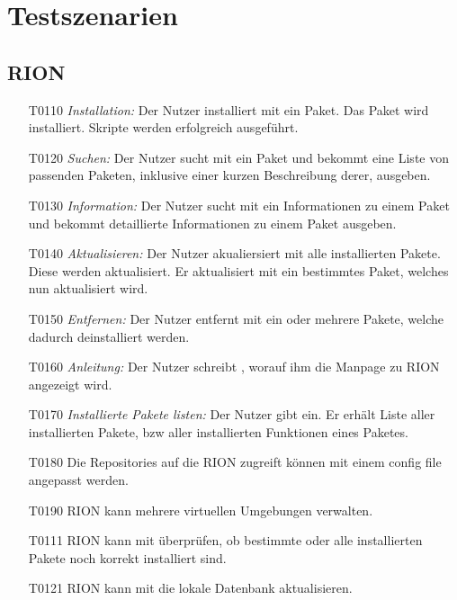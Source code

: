\chapter{Testszenarien}

\section{RION}

\begin{itemize}
	\item[T0110] \textit{Installation:} Der Nutzer installiert mit  ein Paket. Das Paket wird installiert. Skripte werden erfolgreich ausgeführt.
	\item[T0120] \textit{Suchen:} Der Nutzer sucht mit  ein Paket und bekommt eine Liste von passenden Paketen, inklusive einer kurzen Beschreibung derer, ausgeben.
	\item[T0130] \textit{Information:} Der Nutzer sucht mit  ein Informationen zu einem Paket und bekommt detaillierte Informationen zu einem Paket ausgeben.
	\item[T0140] \textit{Aktualisieren:} Der Nutzer akualiersiert mit  alle installierten Pakete. Diese werden aktualisiert. Er aktualisiert mit  ein bestimmtes Paket, welches nun aktualisiert wird.
	\item[T0150] \textit{Entfernen:} Der Nutzer entfernt mit  ein oder mehrere Pakete, welche dadurch deinstalliert werden.
	\item[T0160] \textit{Anleitung:} Der Nutzer schreibt , worauf ihm die Manpage zu RION angezeigt wird.
	\item[T0170] \textit{Installierte Pakete listen:} Der Nutzer gibt  ein. Er erhält Liste aller installierten Pakete, bzw aller installierten Funktionen eines Paketes.
	\item[T0180] Die Repositories auf die RION zugreift können mit einem config file angepasst werden.
	\item[T0190] RION kann mehrere virtuellen Umgebungen verwalten.
	\item[T0111] RION kann mit 	 überprüfen, ob bestimmte oder alle installierten Pakete noch korrekt installiert sind.
	\item[T0121] RION kann mit  die lokale Datenbank aktualisieren.

\end{itemize}


